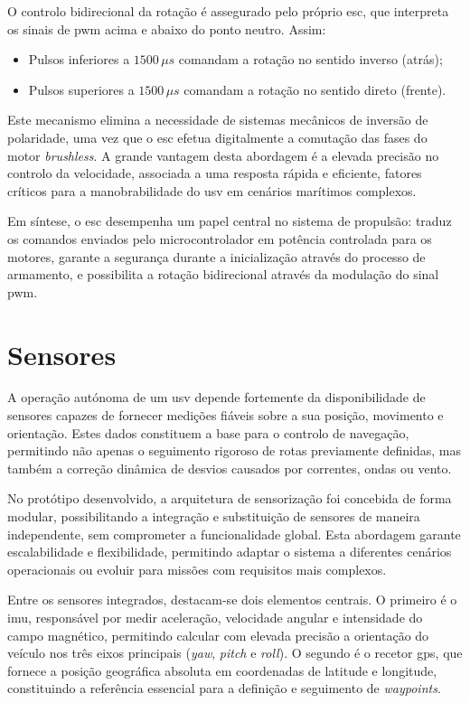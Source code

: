 O controlo bidirecional da rotação é assegurado pelo próprio \gls{esc}, que interpreta os sinais de \gls{pwm} acima e abaixo do ponto neutro. Assim:

\begin{itemize}
    \item Pulsos inferiores a $1500\,\mu s$ comandam a rotação no sentido inverso (atrás);
    \item Pulsos superiores a $1500\,\mu s$ comandam a rotação no sentido direto (frente).
\end{itemize}

Este mecanismo elimina a necessidade de sistemas mecânicos de inversão de polaridade, uma vez que o \gls{esc} efetua digitalmente a comutação das fases do motor \emph{brushless}. A grande vantagem desta abordagem é a elevada precisão no controlo da velocidade, associada a uma resposta rápida e eficiente, fatores críticos para a manobrabilidade do \gls{usv} em cenários marítimos complexos.

Em síntese, o \gls{esc} desempenha um papel central no sistema de propulsão: traduz os comandos enviados pelo microcontrolador em potência controlada para os motores, garante a segurança durante a inicialização através do processo de armamento, e possibilita a rotação bidirecional através da modulação do sinal \gls{pwm}.

\section{Sensores} 
\label{sec:sensores}

A operação autónoma de um \gls{usv} depende fortemente da disponibilidade de sensores capazes de fornecer medições fiáveis sobre a sua posição, movimento e orientação. Estes dados constituem a base para o controlo de navegação, permitindo não apenas o seguimento rigoroso de rotas previamente definidas, mas também a correção dinâmica de desvios causados por correntes, ondas ou vento.  

No protótipo desenvolvido, a arquitetura de sensorização foi concebida de forma modular, possibilitando a integração e substituição de sensores de maneira independente, sem comprometer a funcionalidade global. Esta abordagem garante escalabilidade e flexibilidade, permitindo adaptar o sistema a diferentes cenários operacionais ou evoluir para missões com requisitos mais complexos.  

Entre os sensores integrados, destacam-se dois elementos centrais. O primeiro é o \acrfull{imu}, responsável por medir aceleração, velocidade angular e intensidade do campo magnético, permitindo calcular com elevada precisão a orientação do veículo nos três eixos principais (\emph{yaw}, \emph{pitch} e \emph{roll}). O segundo é o recetor \acrfull{gps}, que fornece a posição geográfica absoluta em coordenadas de latitude e longitude, constituindo a referência essencial para a definição e seguimento de \emph{waypoints}.  

